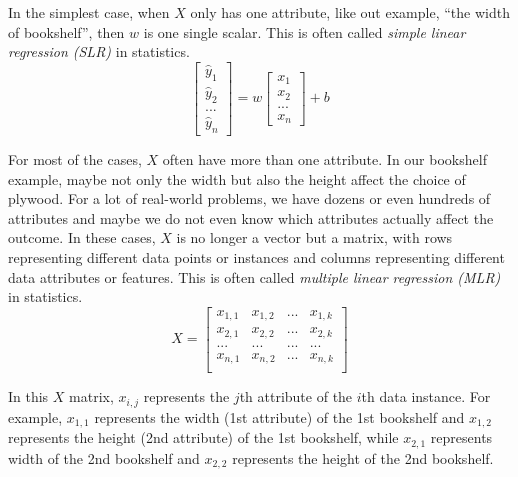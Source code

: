 \documentclass[
	letterpaper
]{article}
\begin{document}
In the simplest case, when $X$ only has one attribute, like out example, ``the width of bookshelf'', then $w$ is one single scalar.
This is often called \textit{simple linear regression (SLR)} in statistics.
\begin{equation}
\begin{bmatrix}\hat y_1 \\ \hat y_2 \\ ... \\ \hat y_n\end{bmatrix}
 = w\begin{bmatrix} x_1 \\  x_2 \\ ... \\ x_n\end{bmatrix}+b
\end{equation}

For most of the cases, $X$ often have more than one attribute. 
In our bookshelf example, maybe not only the width but also the height affect the choice of plywood.
For a lot of real-world problems, we have dozens or even hundreds of attributes and maybe we do not even know which attributes actually affect the outcome.
In these cases, $X$ is no longer a vector but a matrix, with rows representing different data points or instances and columns representing different data attributes or features.
This is often called \textit{multiple linear regression (MLR)} in statistics.
\begin{equation}
X =
\begin{bmatrix}
x_{1, 1} & x_{1, 2} & ... & x_{1, k} \\
x_{2, 1} & x_{2, 2} & ... & x_{2, k} \\
... & ... & ... & ... \\
x_{n, 1} & x_{n, 2} & ... & x_{n, k} \\
\end{bmatrix}
\end{equation}

In this $X$ matrix, $x_{i, j}$ represents the $j$th attribute of the $i$th data instance.
For example, $x_{1, 1}$ represents the width (1st attribute) of the 1st bookshelf and $x_{1, 2}$ represents the height (2nd attribute) of the 1st bookshelf, while $x_{2, 1}$ represents width of the 2nd bookshelf and $x_{2, 2}$ represents the height of the 2nd bookshelf.
\end{document}
